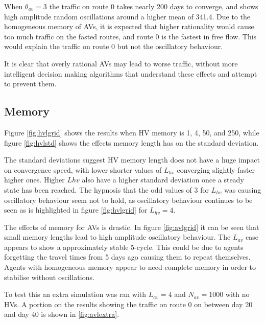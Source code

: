 \documentclass[12pt, a4paper, onecolumn]{article}
\begin{document}
When $\theta_{av} = 3$ the traffic on route 0 takes nearly 200 days to converge, and shows high amplitude random oscillations around a higher mean of 341.4. Due to the homogeneous memory of AVs, it is expected that higher rationality would cause too much traffic on the fasted routes, and route 0 is the fastest in free flow. This would explain the traffic on route 0 but not the oscillatory behaviour.

It is clear that overly rational AVs may lead to worse traffic, without more intelligent decision making algorithms that understand these effects and attempt to prevent them. 

\subsection{Memory}
Figure \ref{fig:hvlgrid} shows the results when HV memory is 1, 4, 50, and 250, while figure \ref{fig:hvlstd} shows the effects memory length has on the standard deviation. 

The standard deviations suggest HV memory length does not have a huge impact on convergence speed, with lower shorter values of $L_{hv}$ converging slightly faster higher ones. Higher $L{hv}$ also have a higher standard deviation once a steady state has been reached. The hypnosis that the odd values of $3$ for $L_{hv}$ was causing oscillatory behaviour seem not to hold, as oscillatory behaviour continues to be seen as is highlighted in figure \ref{fig:hvlgrid} for $L_{hv} = 4$.

The effects of memory for AVs is drastic. In figure \ref{fig:avlgrid} it can be seen that small memory lengths lead to high amplitude oscillatory behaviour. The $L_{av}$ case appears to show a approximately stable 5-cycle. This could be due to agents forgetting the travel times from 5 days ago causing them to repeat themselves. Agents with homogeneous memory appear to need complete memory in order to stabilise without oscillations.

To test this an extra simulation was ran with $L_{av} = 4$ and $N_{av} = 1000$ with no HVs. A portion on the results showing the traffic on route 0 on between day 20 and day 40 is shown in \ref{fig:avlextra}.
\end{document}
